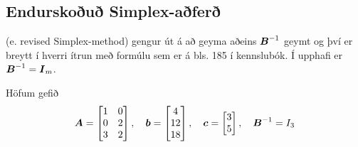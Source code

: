 \subsection{Endurskoðuð Simplex-aðferð}\label{sec:revisedSimplex}
 (e. revised Simplex-method) gengur út á að geyma aðeins ${\mbox{\boldmath$B$}}^{-1}$ geymt og því er breytt í hverri ítrun með formúlu sem er á bls. 185 í kennslubók. Í upphafi er ${\mbox{\boldmath$B$}}^{-1}={\mbox{\boldmath$I$}}_m$. 
\newpage
\lstset{language=matlab}
\begin{daemi}Höfum gefið
$${\mbox{\boldmath$A$}}=\begin{bmatrix}1 & 0\\0 & 2\\3 & 2\end{bmatrix}, \quad {\mbox{\boldmath$b$}}=\begin{bmatrix}4\\12\\18\end{bmatrix},\quad{\mbox{\boldmath$c$}}=\begin{bmatrix}3\\5\end{bmatrix},\quad {\mbox{\boldmath$B$}}^{-1}=I_3$$ 
\end{daemi}
